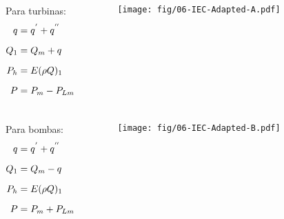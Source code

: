     \begin{frame}\vspace*{-1em}
        \begin{columns}
            Para turbinas:
            \begin{align*}
                q &= q^{'} + q^{''} \\[\medskipamount]
                Q_1 &= Q_m + q \\[\medskipamount]
                P_h &= E(\rho Q)_1 \\[\medskipamount]
                P &= P_m - P_{Lm}
            \end{align*}
            \begin{center}
                \begin{figure}
                    \texttt{[image: fig/06-IEC-Adapted-A.pdf]}
                \end{figure}
            \end{center}
        \end{columns}
    \end{frame}

    \begin{frame}\vspace*{-1em}
        \begin{columns}
            Para bombas:
            \begin{align*}
                q &= q^{'} + q^{''} \\[\medskipamount]
                Q_1 &= Q_m - q \\[\medskipamount]
                P_h &= E(\rho Q)_1 \\[\medskipamount]
                P &= P_m + P_{Lm}
            \end{align*}
            \begin{center}
                \begin{figure}
                    \texttt{[image: fig/06-IEC-Adapted-B.pdf]}
                \end{figure}
            \end{center}
        \end{columns}
    \end{frame}


